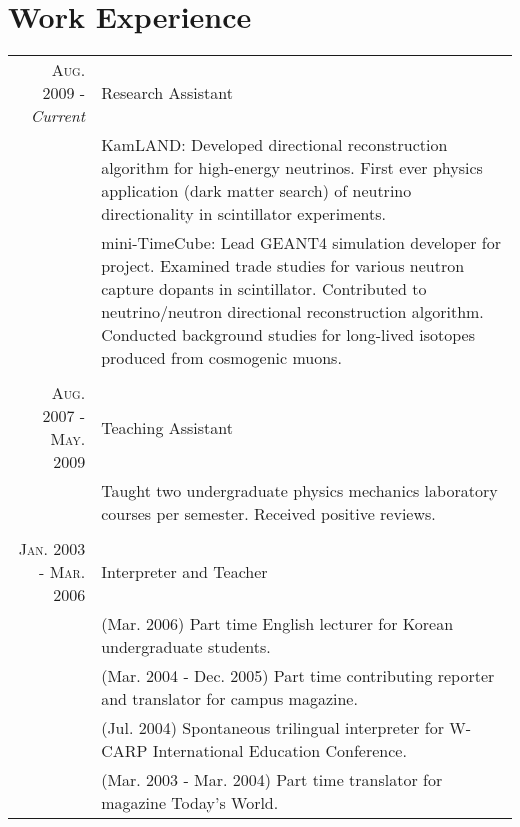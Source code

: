 \documentclass[a4paper,10pt]{article} %
\begin{document}

\section{Work Experience}

\begin{tabular}{r|p{10.4cm}}
\textsc{Aug. 2009 - }\textit{Current} & Research Assistant\\
& \footnotesize{
	KamLAND: Developed directional reconstruction algorithm for
	high-energy neutrinos.
	First ever physics application (dark matter search) of neutrino
	directionality in scintillator experiments.
}\\
& \footnotesize{
	mini-TimeCube: Lead GEANT4 simulation developer for project.
	Examined trade studies for various neutron capture dopants in
	scintillator.
	Contributed to neutrino/neutron directional reconstruction algorithm.
	Conducted background studies for long-lived isotopes produced from
	cosmogenic muons.
}\\
\multicolumn{2}{c}{} \\


\textsc{Aug. 2007 - May. 2009} & Teaching Assistant\\
& \footnotesize{
	Taught two undergraduate physics mechanics laboratory courses per semester.
	Received positive reviews.
}\\
\multicolumn{2}{c}{} \\


\textsc{Jan. 2003 - Mar. 2006} & Interpreter and Teacher\\
& \footnotesize{(Mar. 2006) Part time English lecturer for Korean undergraduate
students.}\\
& \footnotesize{(Mar. 2004 - Dec. 2005) Part time contributing reporter and
translator for campus magazine.}\\
& \footnotesize{(Jul. 2004) Spontaneous trilingual interpreter for W-CARP
International Education Conference.}\\
& \footnotesize{(Mar. 2003 - Mar. 2004) Part time translator for magazine Today's World.}\\
\end{tabular}
\end{document}

